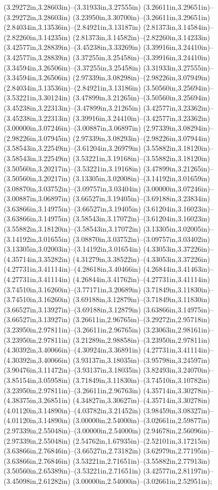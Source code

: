 (3.29272in,3.28603in)--(3.31933in,3.27555in) (3.26611in,3.29651in)--(3.29272in,3.28603in) (3.23950in,3.30700in)--(3.26611in,3.29651in) (2.84034in,3.13536in)--(2.84921in,3.13187in) (2.81373in,3.14584in)--(2.82260in,3.14235in) (2.81373in,3.14582in)--(2.82260in,3.14233in) (3.42577in,3.28839in)--(3.45238in,3.33269in) (3.39916in,3.24410in)--(3.42577in,3.28839in) (3.37255in,3.25458in)--(3.39916in,3.24410in) (3.34594in,3.26506in)--(3.37255in,3.25458in) (3.31933in,3.27555in)--(3.34594in,3.26506in) (2.97339in,3.08298in)--(2.98226in,3.07949in) (2.84034in,3.13536in)--(2.84921in,3.13186in) (3.50560in,3.25694in)--(3.53221in,3.30124in) (3.47899in,3.21265in)--(3.50560in,3.25694in) (3.45238in,3.22313in)--(3.47899in,3.21265in) (3.42577in,3.23362in)--(3.45238in,3.22313in) (3.39916in,3.24410in)--(3.42577in,3.23362in) (3.00000in,3.07246in)--(3.00887in,3.06897in) (2.97339in,3.08294in)--(2.98226in,3.07945in) (2.97339in,3.08293in)--(2.98226in,3.07944in) (3.58543in,3.22549in)--(3.61204in,3.26979in) (3.55882in,3.18120in)--(3.58543in,3.22549in) (3.53221in,3.19168in)--(3.55882in,3.18120in) (3.50560in,3.20217in)--(3.53221in,3.19168in) (3.47899in,3.21265in)--(3.50560in,3.20217in) (3.13305in,3.02008in)--(3.14192in,3.01659in) (3.08870in,3.03752in)--(3.09757in,3.03404in) (3.00000in,3.07246in)--(3.00887in,3.06897in) (3.66527in,3.19405in)--(3.69188in,3.23834in) (3.63866in,3.14975in)--(3.66527in,3.19405in) (3.61204in,3.16023in)--(3.63866in,3.14975in) (3.58543in,3.17072in)--(3.61204in,3.16023in) (3.55882in,3.18120in)--(3.58543in,3.17072in) (3.13305in,3.02005in)--(3.14192in,3.01655in) (3.08870in,3.03752in)--(3.09757in,3.03402in) (3.13305in,3.02003in)--(3.14192in,3.01654in) (4.33053in,3.37226in)--(4.35714in,3.35282in) (4.31279in,3.38522in)--(4.33053in,3.37226in) (4.27731in,3.41114in)--(4.28618in,3.40466in) (4.26844in,3.41463in)--(4.27731in,3.41114in) (4.26844in,3.41762in)--(4.27731in,3.41114in) (3.74510in,3.16260in)--(3.77171in,3.20689in) (3.71849in,3.11830in)--(3.74510in,3.16260in) (3.69188in,3.12879in)--(3.71849in,3.11830in) (3.66527in,3.13927in)--(3.69188in,3.12879in) (3.63866in,3.14975in)--(3.66527in,3.13927in) (3.26611in,2.96765in)--(3.29272in,2.95718in) (3.23950in,2.97811in)--(3.26611in,2.96765in) (3.23063in,2.98161in)--(3.23950in,2.97811in) (3.21289in,2.98858in)--(3.23950in,2.97811in) (4.30392in,3.40066in)--(4.30924in,3.36891in) (4.27731in,3.41114in)--(4.30392in,3.40066in) (3.93137in,3.18035in)--(3.95798in,3.24597in) (3.90476in,3.11472in)--(3.93137in,3.18035in) (3.82493in,3.24070in)--(3.85154in,3.05958in) (3.71849in,3.11830in)--(3.74510in,3.10782in) (3.23950in,2.97811in)--(3.26611in,2.96763in) (4.35714in,3.30278in)--(4.38375in,3.26851in) (4.34827in,3.30627in)--(4.35714in,3.30278in) (4.01120in,3.14890in)--(4.03782in,3.21452in) (3.98459in,3.08327in)--(4.01120in,3.14890in) (3.00000in,2.54000in)--(3.02661in,2.59877in) (2.97339in,2.55048in)--(3.00000in,2.54000in) (2.94678in,2.56096in)--(2.97339in,2.55048in) (2.54762in,1.67935in)--(2.52101in,3.17215in) (3.63866in,2.76846in)--(3.66527in,2.73182in) (3.62979in,2.77195in)--(3.63866in,2.76846in) (3.53221in,2.71651in)--(3.55882in,2.77913in) (3.50560in,2.65389in)--(3.53221in,2.71651in) (3.42577in,2.81197in)--(3.45098in,2.61282in) (3.00000in,2.54000in)--(3.02661in,2.52951in);
